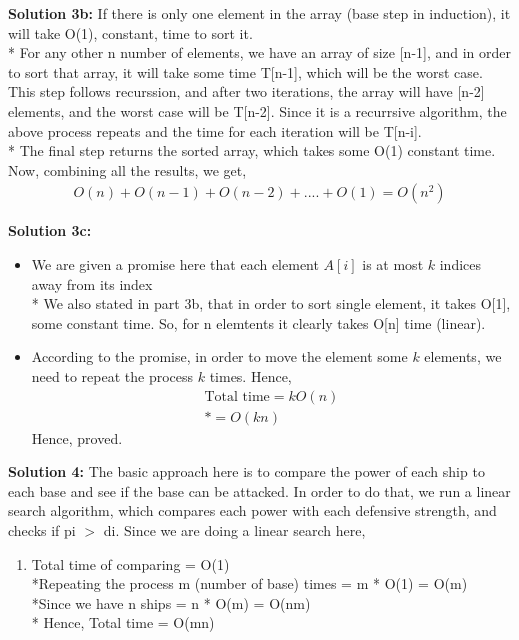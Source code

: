 \documentclass{article}
\theoremstyle{definition}
\begin{document}
\textbf{Solution 3b:} 
	If there is only one element in the array (base step in induction), it will take O(1), constant, time to sort it.\bigskip\\*
	For any other n number of elements, we have an array of size [n-1], and in order to sort that array, it will take some time T[n-1], which will be the worst case. This step follows recurssion, and  after two iterations, the array will have [n-2] elements, and the worst case will be T[n-2]. Since it is a recurrsive algorithm, the above process repeats and the time for each iteration will be T[n-i].\bigskip\\*
	The final step returns the sorted array, which takes some O(1) constant time.
	Now, combining all the results, we get,
	\begin{align*}
		O(n) + O(n-1) + O(n-2) +  .... + O(1) = O(n^{2})
	\end{align*}

\textbf{Solution 3c:} 
	\begin{itemize}
		\item We are given a promise here that each element $A[i]$ is at most $k$ indices away from its index \bigskip \\*
		We also stated in part 3b, that in order to sort single element, it takes O[1], some constant time. So, for n elemtents it clearly takes O[n] time (linear).
		\item According to the promise, in order to move the element some $k$ elements, we need to repeat the process $k$ times.
		Hence,
		\begin{align*}
			{\text{Total time}} = kO(n)\\*
			 = O(kn)
		\end{align*}
			Hence, proved.
	\end{itemize}


\textbf{Solution 4: } The basic approach here is to compare the power of each ship to each base and see if the base can be attacked. In order to do that, we run a linear search algorithm, which compares each power with each defensive strength, and checks if pi $>$ di. 
Since we are doing a linear search here,
	\begin{enumerate}
		\item[]Total time of comparing = O(1)\\*Repeating the process m (number of base) times = m * O(1) = O(m)\\*Since we have n ships = n * O(m) = O(nm)\bigskip\\* Hence, Total time = O(mn)
	\end{enumerate}
\end{document}
